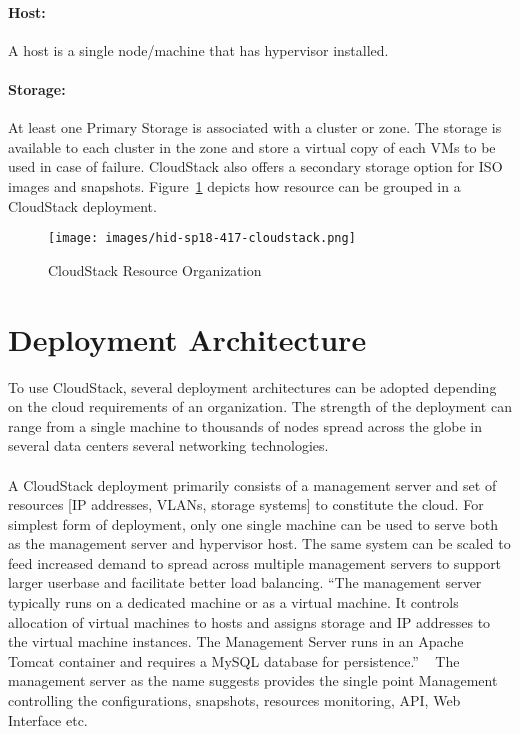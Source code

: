 \paragraph{Host:}	A host is a single node/machine that has hypervisor installed.
\paragraph{Storage:}	At least one Primary Storage is associated with a cluster or zone. The 
storage is available to each cluster in the zone and store a virtual copy of 
each VMs to be used in case of failure. CloudStack also offers a secondary storage
option for ISO images and snapshots.
Figure~\ref{F:cloudstack-resource-group} depicts how resource can 
be grouped in a CloudStack
deployment.
\begin{figure}[htb]
\texttt{[image: images/hid-sp18-417-cloudstack.png]}
\caption{CloudStack Resource Organization~\cite{hid-sp18-417-cloudstack-resource-grouping}}
\label{F:cloudstack-resource-group}
\end{figure}

\section{Deployment Architecture}

To use CloudStack, several deployment architectures can be adopted
depending on the cloud requirements of an organization. The strength
of the deployment can range from a single machine to thousands of
nodes spread across the globe in several data centers several
networking technologies.

\paragraph {} A CloudStack deployment primarily consists of a management server and
set of resources [IP addresses, VLANs, storage systems] to constitute
the cloud.  For simplest form of deployment, only one single machine
can be used to serve both as the management server and hypervisor
host. The same system can be scaled to feed increased demand to spread
across multiple management servers to support larger userbase and
facilitate better load balancing. ``The management server typically runs
on a dedicated machine or as a virtual machine. It controls allocation
of virtual machines to hosts and assigns storage and IP addresses to
the virtual machine instances. The Management Server runs in an Apache
Tomcat container and requires a MySQL database for
persistence.'' ~\cite{hid-sp18-417-www-cloudstack-management-server} 
The management server as the name suggests provides the single point 
Management controlling the configurations, snapshots, resources monitoring, 
API, Web Interface etc. 



